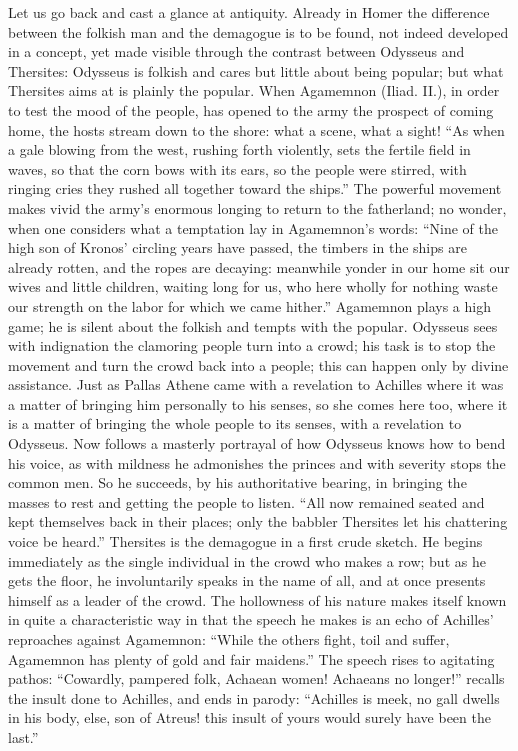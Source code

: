 \documentclass[12pt]{book}
\newcommand{\opage}[1]{\marginnote{\footnotesize\textit{[#1]}}}
\begin{document}
Let us go back and cast a glance at antiquity. Already in Homer the
difference between the folkish man and the demagogue is to be found, not
indeed developed in a concept, yet made visible through the contrast
between Odysseus and Thersites: Odysseus is folkish and cares but little
about being popular; but what Thersites aims at is plainly the popular.
When Agamemnon (Iliad. II.), in order to test the mood of the people, has
\opage{130}\setcounter{footnote}{0}%
opened to the army the prospect of coming home, the hosts stream down to
the shore: what a scene, what a sight! ``As when a gale blowing from the
west, rushing forth violently, sets the fertile field in waves, so that
the corn bows with its ears, so the people were stirred, with ringing
cries they rushed all together toward the ships.'' The powerful movement
makes vivid the army's enormous longing to return to the fatherland; no
wonder, when one considers what a temptation lay in Agamemnon's words:
``Nine of the high son of Kronos' circling years have passed, the timbers
in the ships are already rotten, and the ropes are decaying: meanwhile
yonder in our home sit our wives and little children, waiting long for
us, who here wholly for nothing waste our strength on the labor for
which we came hither.'' Agamemnon plays a high game; he is silent about
the folkish and tempts with the popular. Odysseus sees with indignation
the clamoring people turn into a crowd; his task is to stop the movement
and turn the crowd back into a people; this can happen only by divine
assistance. Just as Pallas Athene came with a revelation to Achilles
where it was a matter of bringing him personally to his senses, so she
comes here too, where it is a matter of bringing the whole people to
its senses, with a revelation to Odysseus. Now follows a masterly
portrayal of how Odysseus knows how to bend his voice, as with mildness
he admonishes the princes and with severity stops the common men. So he
succeeds, by his authoritative bearing, in bringing the masses to rest
and getting the people to listen. ``All now remained seated and kept
themselves back in their places; only the babbler Thersites let his
chattering voice be heard.'' Thersites is the demagogue in a first crude
sketch. He begins immediately as the single individual in the crowd who
makes a row; but as he gets the floor, he involuntarily speaks in
\opage{131}\setcounter{footnote}{0}%
the name of all, and at once presents himself as a leader of the crowd.
The hollowness of his nature makes itself known in quite a
characteristic way in that the speech he makes is an echo of Achilles'
reproaches against Agamemnon: ``While the others fight, toil and suffer,
Agamemnon has plenty of gold and fair maidens.'' The speech rises to
agitating pathos: ``Cowardly, pampered folk, Achaean women! Achaeans no
longer!'' recalls the insult done to Achilles, and ends in parody:
``Achilles is meek, no gall dwells in his body, else, son of Atreus!
this insult of yours would surely have been the last.''
\end{document}
